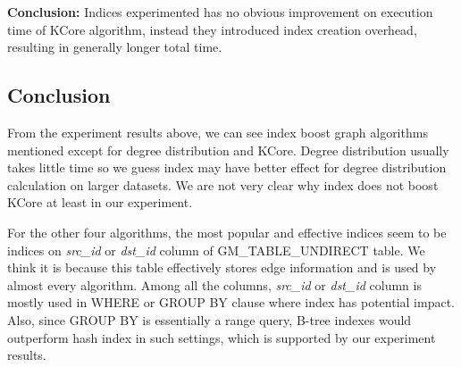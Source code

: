 \par \textbf{Conclusion:} Indices experimented has no obvious improvement on execution time of KCore algorithm, instead they introduced index creation overhead, resulting in generally longer total time.

\subsection{Conclusion}
\par From the experiment results above, we can see index boost graph algorithms mentioned except for degree distribution and KCore. Degree distribution usually takes little time so we guess index may have better effect for degree distribution calculation on larger datasets. We are not very clear why index does not boost KCore at least in our experiment.
\par For the other four algorithms, the most popular and effective indices seem to be indices on \textit{src\_id} or \textit{dst\_id} column of GM\_TABLE\_UNDIRECT table. We think it is because this table effectively stores edge information and is used by almost every algorithm. Among all the columns, 
\textit{src\_id} or \textit{dst\_id} column is mostly used in WHERE or GROUP BY clause where index has potential impact. Also, since GROUP BY is essentially a range query, B-tree indexes would outperform hash index in such settings, which is supported by our experiment results.
